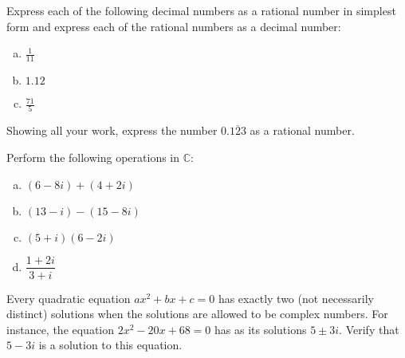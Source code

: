 \documentclass[11pt,letterpaper]{article}
\begin{document}

 Express each of the following decimal numbers as a rational number in simplest form and express each of the rational numbers as a decimal number:
	\begin{enumerate}[(a)]
	\item $\frac{1}{11}$
	\item $1.12$
	\item $\frac{71}{5}$
	\end{enumerate}



\newpage



 Showing all your work, express the number $0.\overline{123}$ as a rational number. 



\newpage



 Perform the following operations in $\mathbb{C}$:
	\begin{enumerate}[(a)]
	\item $(6 - 8i) + (4 + 2i)$
	\item $(13 - i) - (15 - 8i)$
	\item $(5 + i)(6 - 2i)$
	\item $\dfrac{1 + 2i}{3 + i}$
	\end{enumerate}



\newpage



 Every quadratic equation $ax^2 + bx + c= 0$ has exactly two (not necessarily distinct) solutions when the solutions are allowed to be complex numbers. For instance, the equation $2x^2 - 20x + 68= 0$ has as its solutions $5 \pm 3i$. Verify that $5 - 3i$ is a solution to this equation. 
\end{document}
